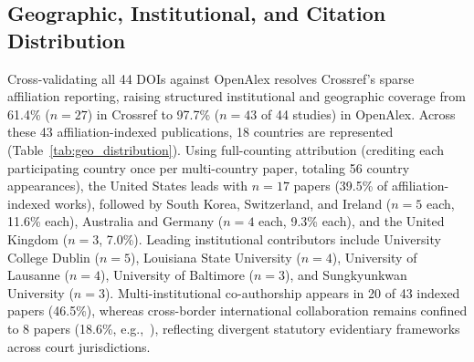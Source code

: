 \subsection{Geographic, Institutional, and Citation Distribution}
Cross-validating all 44 DOIs against OpenAlex resolves Crossref's sparse affiliation reporting, raising structured institutional and geographic coverage from 61.4\% ($n=27$) in Crossref to 97.7\% ($n=43$ of 44 studies) in OpenAlex. Across these 43 affiliation-indexed publications, 18 countries are represented (Table~\ref{tab:geo_distribution}). Using full-counting attribution (crediting each participating country once per multi-country paper, totaling 56 country appearances), the United States leads with $n=17$ papers (39.5\% of affiliation-indexed works), followed by South Korea, Switzerland, and Ireland ($n=5$ each, 11.6\% each), Australia and Germany ($n=4$ each, 9.3\% each), and the United Kingdom ($n=3$, 7.0\%). Leading institutional contributors include University College Dublin ($n=5$), Louisiana State University ($n=4$), University of Lausanne ($n=4$), University of Baltimore ($n=3$), and Sungkyunkwan University ($n=3$). Multi-institutional co-authorship appears in 20 of 43 indexed papers (46.5\%), whereas cross-border international collaboration remains confined to 8 papers (18.6\%, e.g.,~\cite{michelet2025_finetuning, hammar2026_a, sava2026_triagecpg}), reflecting divergent statutory evidentiary frameworks across court jurisdictions.

